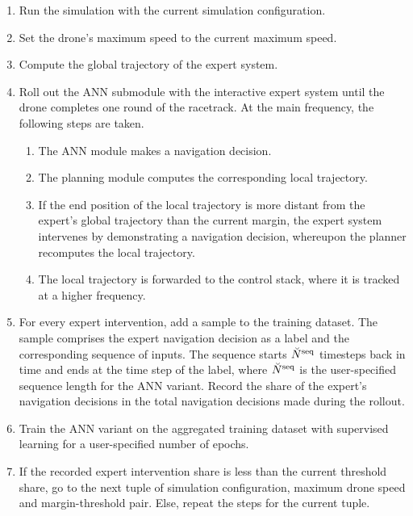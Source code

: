 \begin{enumerate}
    \item Run the simulation with the current simulation configuration.
    \item Set the drone's maximum speed to the current maximum speed.
    \item Compute the global trajectory of the expert system.
    \item Roll out the ANN submodule with the interactive expert system
    until the drone completes one round of the racetrack.
    At the main frequency, the following steps are taken.
    \begin{enumerate}
        \item The ANN module makes a navigation decision.
        \item The planning module computes the corresponding local trajectory.
        \item If the end position of the local trajectory 
        is more distant from the expert's global trajectory 
        than the current margin,
        the expert system intervenes by demonstrating a navigation decision,
        whereupon the planner recomputes the local trajectory.
        \item The local trajectory is forwarded to the control stack,
        where it is tracked at a higher frequency.
    \end{enumerate}
    \item For every expert intervention, 
    add a sample to the training dataset.
    The sample comprises the expert navigation decision as a label
    and the corresponding sequence of inputs.
    The sequence starts ${}_{}^{} \breve{N}^{\text{seq}}_{}$ timesteps back in time and
    ends at the time step of the label, where ${}_{}^{} \breve{N}^{\text{seq}}_{}$
    is the user-specified sequence length for the ANN variant.
    Record the share of the expert's navigation decisions 
    in the total navigation decisions made during the rollout.
    \item Train the ANN variant on the 
    aggregated training dataset with supervised learning
    for a user-specified number of epochs.
    \item If the recorded expert intervention share is less
    than the current threshold share, go to the next 
    tuple of simulation configuration, maximum drone speed and
    margin-threshold pair. Else, repeat the steps for the current tuple.
\end{enumerate}

